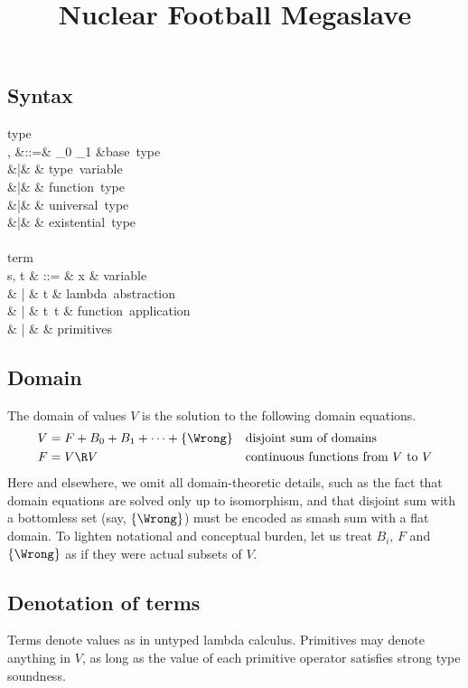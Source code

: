 \documentclass{amsart}
\title{Nuclear Football Megaslave}
\theoremstyle{definition}
\begin{document}
\maketitle
\tableofcontents

\subsection{Syntax}
\begin{syntax}
\mbox{type}\\
\sigma, \tau
&::=& \iota_0 \Or \iota_1 \Or \cdots &\mbox{base type}\\
&|& \alpha \Or \beta \Or \cdots & \mbox{type variable} \\
&|& \tau \rightarrow \tau & \mbox{function type} \\
&|& \All\alpha\tau & \mbox{universal type} \\
&|& \Ex\alpha\tau & \mbox{existential type}
\\
\\
\mbox{term}\\
s, t & ::= & x & \mbox{variable} \\
& | & t  & \mbox{lambda abstraction} \\
& | & t~t & \mbox{function application} \\
& | & \cdots & \mbox{primitives}
\end{syntax}

\subsection{Domain}
The domain of values $V$ is the solution to the following domain
equations.
\begin{align*}
V &= F + B_0 + B_1 + \cdots + \{\Wrong\}
  &&\mbox{disjoint sum of domains}\\
F &= V \R V &&\mbox{continuous functions from $V$ to $V$}
\end{align*}
Here and elsewhere, we omit all domain-theoretic details, such as
the fact that domain equations are solved only up to isomorphism,
and that disjoint sum with a bottomless set (say, $\{\Wrong\}$)
must be encoded as smash sum with a flat domain. To lighten
notational and conceptual burden, let us treat $B_i$, $F$ and
$\{\Wrong\}$ as if they were actual subsets of $V$.

\subsection{Denotation of terms}
\label{denotation-terms}
Terms denote values as in untyped lambda calculus. Primitives may
denote anything in $V$, as long as the value of each primitive
operator satisfies strong type soundness.
\end{document}
